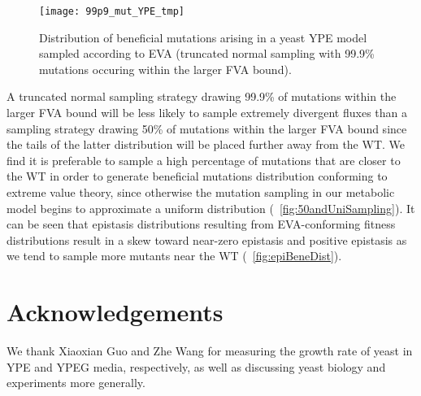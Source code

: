 \begin{figure}
\centering
  \texttt{[image: 99p9\_mut\_YPE\_tmp]}
  \caption{Distribution of beneficial mutations arising in a yeast YPE model 
  sampled according to EVA (truncated normal sampling with 99.9\% mutations
  occuring within the larger FVA bound).}
  \label{fig:mutBeneDist}
\end{figure}

A truncated normal sampling strategy drawing 99.9\% of mutations
within the larger FVA bound will be less likely to sample extremely
divergent fluxes than a sampling strategy drawing 50\% of mutations
within the larger FVA bound since the tails of the latter distribution
will be placed further away from the WT. We find it is preferable to
sample a high percentage of mutations that are closer to the WT in
order to generate beneficial mutations distribution conforming to
extreme value theory, since otherwise the mutation sampling in our
metabolic model begins to approximate a uniform distribution
(\suppOrApp \Fig~\ref{fig:50andUniSampling}). It can be seen that
epistasis distributions resulting from EVA-conforming fitness
distributions result in a skew toward near-zero epistasis and positive
epistasis as we tend to sample more mutants near the WT
(\Fig~\ref{fig:epiBeneDist}).

\section{Acknowledgements}
We thank Xiaoxian Guo and Zhe Wang for measuring the growth rate of
yeast in YPE and YPEG media, respectively, as well as discussing yeast
biology and experiments more generally.









